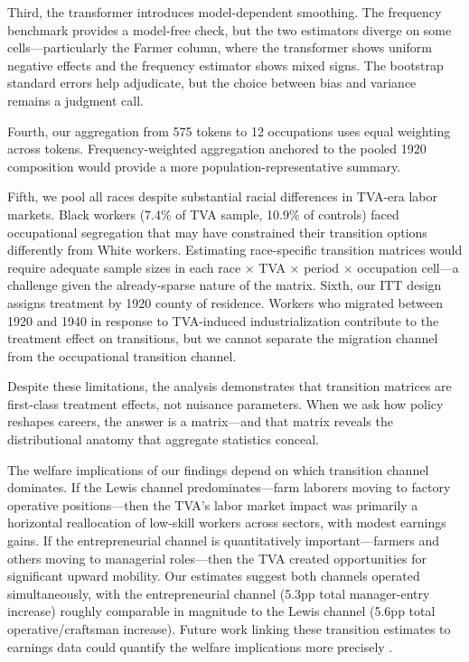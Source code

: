 \documentclass[12pt]{article}
\begin{document}
Third, the transformer introduces model-dependent smoothing. The frequency benchmark provides a model-free check, but the two estimators diverge on some cells---particularly the Farmer column, where the transformer shows uniform negative effects and the frequency estimator shows mixed signs. The bootstrap standard errors help adjudicate, but the choice between bias and variance remains a judgment call.

Fourth, our aggregation from 575 tokens to 12 occupations uses equal weighting across tokens. Frequency-weighted aggregation anchored to the pooled 1920 composition would provide a more population-representative summary.

Fifth, we pool all races despite substantial racial differences in TVA-era labor markets. Black workers (7.4\% of TVA sample, 10.9\% of controls) faced occupational segregation that may have constrained their transition options differently from White workers. Estimating race-specific transition matrices would require adequate sample sizes in each race $\times$ TVA $\times$ period $\times$ occupation cell---a challenge given the already-sparse nature of the matrix. Sixth, our ITT design assigns treatment by 1920 county of residence. Workers who migrated between 1920 and 1940 in response to TVA-induced industrialization contribute to the treatment effect on transitions, but we cannot separate the migration channel from the occupational transition channel.

Despite these limitations, the analysis demonstrates that transition matrices are first-class treatment effects, not nuisance parameters. When we ask how policy reshapes careers, the answer is a matrix---and that matrix reveals the distributional anatomy that aggregate statistics conceal.

The welfare implications of our findings depend on which transition channel dominates. If the Lewis channel predominates---farm laborers moving to factory operative positions---then the TVA's labor market impact was primarily a horizontal reallocation of low-skill workers across sectors, with modest earnings gains. If the entrepreneurial channel is quantitatively important---farmers and others moving to managerial roles---then the TVA created opportunities for significant upward mobility. Our estimates suggest both channels operated simultaneously, with the entrepreneurial channel (5.3pp total manager-entry increase) roughly comparable in magnitude to the Lewis channel (5.6pp total operative/craftsman increase). Future work linking these transition estimates to earnings data could quantify the welfare implications more precisely \citep{hsieh2019}.
\end{document}

